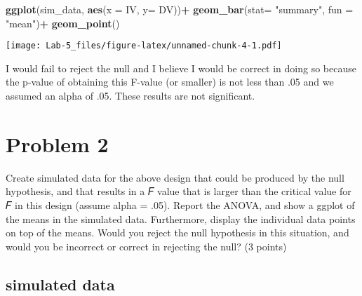 \documentclass[
]{article}
\newenvironment{Shaded}{\begin{snugshade}}{\end{snugshade}}
\newcommand{\DataTypeTok}[1]{\textcolor[rgb]{0.13,0.29,0.53}{#1}}
\newcommand{\KeywordTok}[1]{\textcolor[rgb]{0.13,0.29,0.53}{\textbf{#1}}}
\newcommand{\NormalTok}[1]{#1}
\newcommand{\OperatorTok}[1]{\textcolor[rgb]{0.81,0.36,0.00}{\textbf{#1}}}
\newcommand{\StringTok}[1]{\textcolor[rgb]{0.31,0.60,0.02}{#1}}
\begin{document}
\begin{Shaded}
\begin{Highlighting}[]
\KeywordTok{ggplot}\NormalTok{(sim_data, }\KeywordTok{aes}\NormalTok{(}\DataTypeTok{x =}\NormalTok{ IV, }\DataTypeTok{y=}\NormalTok{ DV))}\OperatorTok{+}
\StringTok{  }\KeywordTok{geom_bar}\NormalTok{(}\DataTypeTok{stat=} \StringTok{"summary"}\NormalTok{, }\DataTypeTok{fun =} \StringTok{"mean"}\NormalTok{)}\OperatorTok{+}
\StringTok{  }\KeywordTok{geom_point}\NormalTok{()}
\end{Highlighting}
\end{Shaded}

\texttt{[image: Lab-5\_files/figure-latex/unnamed-chunk-4-1.pdf]}

I would fail to reject the null and I believe I would be correct in
doing so because the p-value of obtaining this F-value (or smaller) is
not less than .05 and we assumed an alpha of .05. These results are not
significant.

\hypertarget{problem-2}{%
\section{Problem 2}\label{problem-2}}

Create simulated data for the above design that could be produced by the
null hypothesis, and that results in a 𝐹 value that is larger than the
critical value for 𝐹 in this design (assume alpha = .05). Report the
ANOVA, and show a ggplot of the means in the simulated data.
Furthermore, display the individual data points on top of the means.
Would you reject the null hypothesis in this situation, and would you be
incorrect or correct in rejecting the null? (3 points)

\hypertarget{simulated-data-1}{%
\subsection{simulated data}\label{simulated-data-1}}
\end{document}

